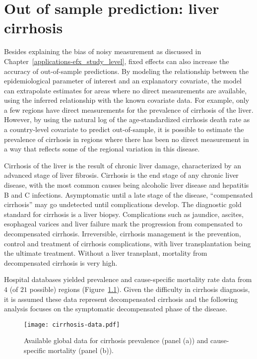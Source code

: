 \chapter{Out of sample prediction: liver cirrhosis}
\label{applications-efx_country_level}

Besides explaining the bias of noisy measurement as discussed in
Chapter~\ref{applications-efx_study_level}, fixed effects can also
increase the accuracy of out-of-sample predictions.  By modeling the
relationship between the epidemiological parameter of interest and an
explanatory covariate, the model can extrapolate estimates for areas
where no direct measurements are available, using the inferred
relationship with the known covariate data.  For example, only a few
regions have direct measurements for the prevalence of cirrhosis of
the liver.  However, by using the natural log of the age-standardized
cirrhosis death rate as a country-level covariate to predict
out-of-sample, it is possible to estimate the prevalence of cirrhosis
in regions where there has been no direct measurement in a way that
reflects some of the regional variation in this disease.

Cirrhosis of the liver is the result of chronic liver damage,
characterized by an advanced stage of liver fibrosis.  Cirrhosis is
the end stage of any chronic liver disease, with the most common
causes being alcoholic liver disease and hepatitis B and C infections.
Asymptomatic until a late stage of the disease, ``compensated
cirrhosis'' may go undetected until complications develop.  The
diagnostic gold standard for cirrhosis is a liver biopsy.
Complications such as jaundice, ascites, esophageal varices  
and liver failure mark the progression
from compensated to decompensated cirrhosis.  Irreversible, cirrhosis
management is the prevention, control and treatment of cirrhosis
complications, with liver transplantation being the ultimate
treatment.  Without a liver transplant, mortality from decompensated
cirrhosis is very high. \cite{garcia-tsao_management_2009,
  damico_natural_2006, schuppan_liver_2008}

Hospital databases yielded prevalence and cause-specific mortality rate
data from $4$ (of $21$ possible) regions (Figure~\ref{fig:app-cirrhosis data}).  
Given the difficulty in
cirrhosis diagnosis, it is assumed these data represent decompensated
cirrhosis and the following analysis focuses on the symptomatic
decompensated phase of the disease.

    \begin{figure}[h]
        \begin{center}
            \texttt{[image: cirrhosis-data.pdf]}
            \caption{Available global data for cirrhosis prevalence
              (panel (a)) and cause-specific mortality (panel (b)).}
            \label{fig:app-cirrhosis data}
        \end{center}
    \end{figure}

